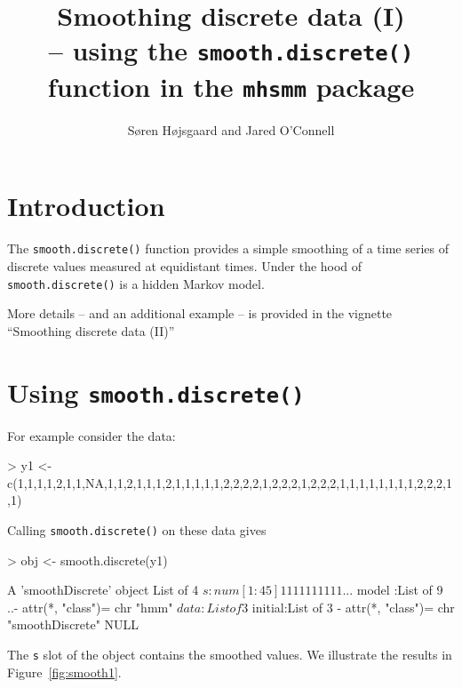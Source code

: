 \documentclass{article}
\title{Smoothing discrete data (I)\\ -- using the \texttt{smooth.discrete()} function in the
  \texttt{mhsmm} package}
\author{S{\o}ren H{\o}jsgaard and Jared O'Connell}
\begin{document}
 
\renewenvironment{Schunk}{\linespread{.85}\small}{}

\maketitle

\parindent0pt\parskip5pt

\tableofcontents



\section{Introduction}


The \verb'smooth.discrete()' function provides a simple smoothing of a
time series of discrete values measured at equidistant times.
Under the hood of  \verb'smooth.discrete()' is a hidden Markov model.

More details -- and an additional example -- is provided in the
vignette ``Smoothing discrete data (II)''

\section{Using \texttt{smooth.discrete()}}

For example consider the data:
\begin{Schunk}
\begin{Sinput}
> y1 <- c(1,1,1,1,2,1,1,NA,1,1,2,1,1,1,2,1,1,1,1,1,2,2,2,2,1,2,2,2,1,2,2,2,1,1,1,1,1,1,1,1,2,2,2,1,1) 
\end{Sinput}
\end{Schunk}

Calling \verb'smooth.discrete()' on these data gives 
\begin{Schunk}
\begin{Sinput}
> obj <- smooth.discrete(y1)
\end{Sinput}
\begin{Soutput}
A 'smoothDiscrete' object
List of 4
 $ s      : num [1:45] 1 1 1 1 1 1 1 1 1 1 ...
 $ model  :List of 9
  ..- attr(*, "class")= chr "hmm"
 $ data   :List of 3
 $ initial:List of 3
 - attr(*, "class")= chr "smoothDiscrete"
NULL
\end{Soutput}
\end{Schunk}

The \verb's' slot of the object contains the smoothed values. We
illustrate the results in Figure~\ref{fig:smooth1}.
\end{document}
